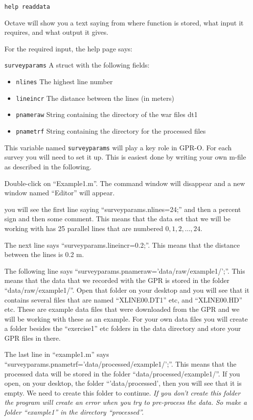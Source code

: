 \documentclass[11pt]{article}
\begin{document}
\qquad \verb#help readdata#

Octave will show you a text saying from where function is stored, what
input it requires, and what output it gives.

For the required input, the help page says:

\verb#surveyparams# A struct with the following fields:
\vspace{-0.5cm}
\begin{itemize}
\item \verb#nlines# The highest line number
\item \verb"lineincr" The distance between the lines (in meters)
\item \verb#pnameraw# String containing the directory of the war files
  dt1
\item \verb#pnametrf# String containing the directory for the
  processed files
\end{itemize}
 
This variable named \verb#surveyparams# will play a key role in
GPR-O. For each survey you will need to set it up. This is easiest
done by writing your own m-file as described in the following.

Double-click on ``Example1.m''. The command window will disappear and
a new window named ``Editor'' will appear.

you will see the first line saying ``surveyparams.nlines=24;'' and
then a percent sign and then some comment.  This means that the data
set that we will be working with has 25 parallel lines that are
numbered $0, 1, 2, \ldots, 24$.

The next line says ``surveyparams.lineincr=0.2;''. This means that the
distance between the lines is 0.2 m.

The following line says
``surveyparams.pnameraw='data/raw/example1/';''. This means that the
data that we recorded with the GPR is stored in the folder
``data/raw/example1/''. Open that folder on your desktop and you will
see that it contains several files that are named ``XLINE00.DT1'' etc,
and ``XLINE00.HD'' etc. These are example data files that were
downloaded from the GPR and we will be working with these as an
example. For your own data files you will create a folder besides the
``exercise1'' etc folders in the data directory and store your GPR
files in there.

The last line in ``example1.m'' says
``surveyparams.pnametrf='data/processed/example1/';''. This means that
the processed data will be stored in the folder
``data/processed/example1/''. If you open, on your desktop, the folder
``'data/processed', then you will see that it is empty. We need to
create this folder to continue. \emph{If you don't create this folder
  the program will create an error when you try to pre-process the
  data. So make a folder ``example1'' in the directory ``processed''.}
\end{document}
